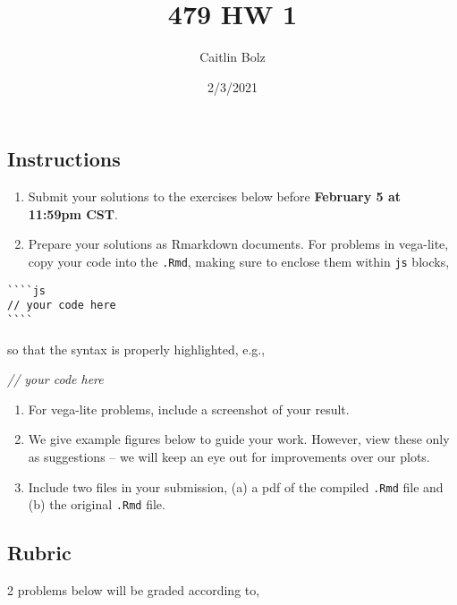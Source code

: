 \documentclass[
]{article}
\title{479 HW 1}
\author{Caitlin Bolz}
\date{2/3/2021}
\newenvironment{Shaded}{\begin{snugshade}}{\end{snugshade}}
\newcommand{\CommentTok}[1]{\textcolor[rgb]{0.56,0.35,0.01}{\textit{#1}}}
\providecommand{\tightlist}{%
  \setlength{\itemsep}{0pt}\setlength{\parskip}{0pt}}
\begin{document}
\maketitle

\hypertarget{instructions}{%
\subsection{Instructions}\label{instructions}}

\begin{enumerate}
\def\labelenumi{\arabic{enumi}.}
\tightlist
\item
  Submit your solutions to the exercises below before \textbf{February 5
  at 11:59pm CST}.
\item
  Prepare your solutions as Rmarkdown documents. For problems in
  vega-lite, copy your code into the \texttt{.Rmd}, making sure to
  enclose them within \texttt{js} blocks,
\end{enumerate}

\begin{verbatim}
````js
// your code here
````
\end{verbatim}

so that the syntax is properly highlighted, e.g.,

\begin{Shaded}
\begin{Highlighting}[]
\CommentTok{// your code here}
\end{Highlighting}
\end{Shaded}

\begin{enumerate}
\def\labelenumi{\arabic{enumi}.}
\setcounter{enumi}{2}
\tightlist
\item
  For vega-lite problems, include a screenshot of your result.
\item
  We give example figures below to guide your work. However, view these
  only as suggestions -- we will keep an eye out for improvements over
  our plots.
\item
  Include two files in your submission, (a) a pdf of the compiled
  \texttt{.Rmd} file and (b) the original \texttt{.Rmd} file.
\end{enumerate}

\hypertarget{rubric}{%
\subsection{Rubric}\label{rubric}}

2 problems below will be graded according to,
\end{document}
